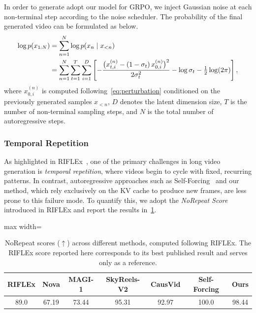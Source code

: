In order to generate adopt our model for GRPO, we inject Gaussian noise at each non-terminal step according to the noise scheduler. The probability of the final generated video can be formulated as below.
\begin{equation}
\begin{aligned}
\footnotesize
\log p(x_{1:N})
&= \sum_{n=1}^{N} \log p\!\left(x_n \mid x_{<n}\right) \\
&= \sum_{n=1}^{N} \sum_{t=1}^{T} \sum_{i=1}^{D}
\left[
-\frac{\big(x^{(n)}_{t,i} - (1-\sigma_t)\,x^{(n)}_{0,i}\big)^{2}}{2\sigma_t^{2}}
- \log \sigma_t
- \tfrac{1}{2}\log(2\pi)
\right],
\end{aligned}
\end{equation}
where $x^{(n)}_{0,i}$ is computed following~\cref{eq:perturbation} conditioned on the previously generated samples $x_{<n}$, $D$ denotes the latent dimension size, $T$ is the number of non-terminal sampling steps, and $N$ is the total number of autoregressive steps.


\subsubsection{Temporal Repetition}
As highlighted in RIFLEx~\citep{zhao2025riflex}, one of the primary challenges in long video generation is \textit{temporal repetition}, where videos begin to cycle with fixed, recurring patterns. In contrast, autoregressive approaches such as Self-Forcing~\citep{huang2025self} and our method, which rely exclusively on the KV cache to produce new frames, are less prone to this failure mode. To quantify this, we adopt the \textit{NoRepeat Score} introduced in RIFLEx and report the results in~\cref{tab:no_repeat_score}.  


\begin{table} %
\vspace{-\baselineskip}              %
\centering
\caption{NoRepeat scores ($\uparrow$) across different methods, computed following RIFLEx. The RIFLEx score reported here corresponds to its best published result and serves only as a reference.}
\label{tab:no_repeat_score}
\begin{adjustbox}{max width=\linewidth}
\begin{tabular}{ccccccc}
\toprule
RIFLEx & Nova & MAGI-1 & SkyReels-V2 & CausVid & Self-Forcing & Ours \\
\midrule
 89.0 & 67.19 & 73.44 & 95.31 & 92.97 & 100.0 & 98.44 \\
\bottomrule
\end{tabular}
\end{adjustbox}
\end{table}


